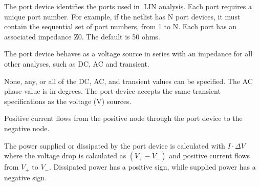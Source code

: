 \begin{Device}
\comments

The port device identifies the ports used in .LIN analysis. Each
port requires a unique port number. For example, if the netlist has
N port devices, it must contain the sequential set of port
numbers, from 1 to N. Each port has an associated impedance Z0. The
default is 50 ohms. 

The port device behaves as a voltage source in series with an impedance
for all other analyses, such as DC, AC and transient.

None, any, or all of the DC, AC, and transient values
can be specified. The AC phase value is in degrees. The port device
accepts the same transient specifications as the voltage (V) sources.

Positive current flows from the positive node through the port
device to the negative node. 

The power supplied or dissipated by the port device is calculated 
with $I \cdot \Delta V$ where the voltage drop is calculated as $(V_+ - V_-)$ 
and positive current flows from $V_+$ to $V_-$.  Dissipated power has a
positive sign, while supplied power has a negative sign.

\end{Device}

